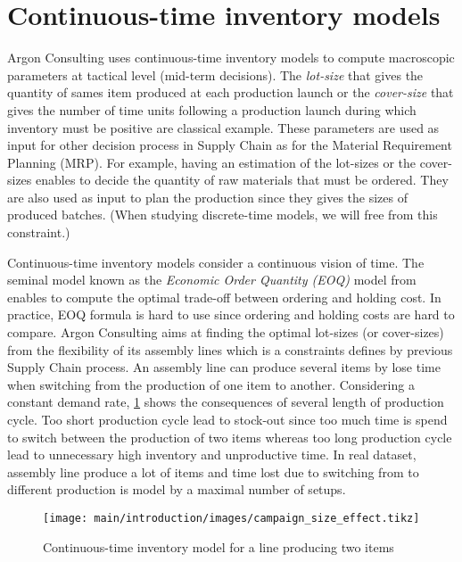 \section{Continuous-time inventory models}
\label{sec:intro:en:continuous-time-inventory-models}


Argon Consulting uses continuous-time inventory models to compute macroscopic parameters at tactical level (mid-term decisions).
The \emph{lot-size} that gives the quantity of sames item produced at each production launch or the \emph{cover-size} that gives the number of time units following a production launch during which inventory must be positive are classical example.
These parameters are used as input for other decision process in Supply Chain as for the Material Requirement Planning (MRP).
For example, having an estimation of the lot-sizes or the cover-sizes enables to decide the quantity of raw materials that must be ordered.
They are also used as input to plan the production since they gives the sizes of produced batches.
(When studying discrete-time models, we will free from this constraint.)


Continuous-time inventory models consider a continuous vision of time.
The seminal model known as the \emph{Economic Order Quantity (EOQ)} model from \citet{Harris1913} enables to compute the optimal trade-off between ordering and holding cost.
In practice, EOQ formula is hard to use since ordering and holding costs are hard to compare.
Argon Consulting aims at finding the optimal lot-sizes (or cover-sizes) from the flexibility of its assembly lines which is a constraints defines by previous Supply Chain process.
An assembly line can produce several items by lose time when switching from the production of one item to another.
Considering a constant demand rate, \cref{fig:intro:en:continuous-time-inventory-model} shows the consequences of several length of production cycle.
Too short production cycle lead to stock-out since too much time is spend to switch between the production of two items whereas too long production cycle lead to unnecessary high inventory and unproductive time.
In real dataset, assembly line produce a lot of items and time lost due to switching from to different production is model by a maximal number of setups.


\begin{figure}[!ht]
  \centering
  \texttt{[image: main/introduction/images/campaign\_size\_effect.tikz]}
  \caption{Continuous-time inventory model for a line producing two items}
  \label{fig:intro:en:continuous-time-inventory-model}
\end{figure}


